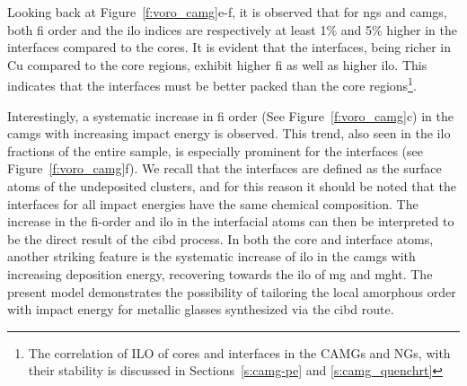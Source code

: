 \begin{changebar}
Looking back at Figure~\ref{f:voro_camg}e-f, it is observed that for \gls{ng}s and \gls{camg}s, both \gls{fi} order and the \gls{ilo} indices are respectively at least 1\% and 5\% higher in the interfaces compared to the cores. It is evident that the interfaces, being richer in Cu compared to the core regions, exhibit higher \gls{fi} as well as higher \gls{ilo}. This indicates that the interfaces must be better packed than the core regions\footnote{The correlation of ILO of cores and interfaces in the CAMGs and NGs, with their stability is discussed in Sections~\ref{s:camg-pe} and \ref{s:camg_quenchrt}}. \par

Interestingly, a systematic increase in \gls{fi} order (See Figure~\ref{f:voro_camg}c) in the \gls{camg}s with increasing impact energy is observed. This trend, also seen in the \gls{ilo} fractions of the entire sample, is especially prominent for the interfaces (see Figure~\ref{f:voro_camg}f). We recall that the interfaces are defined as the surface atoms of the undeposited clusters, and for this reason it should be noted that the interfaces for all impact energies have the same chemical composition. The increase in the \gls{fi}-order and \gls{ilo} in the interfacial atoms can then be interpreted to be the direct result of the \gls{cibd} process. In both the core and interface atoms, another striking feature is the systematic increase of \gls{ilo} in the \gls{camg}s with increasing deposition energy, recovering towards the \gls{ilo} of \gls{mg} and \gls{mght}. The present model demonstrates the possibility of tailoring the local amorphous order with impact energy for metallic glasses synthesized via the \gls{cibd} route.
\end{changebar}

%
